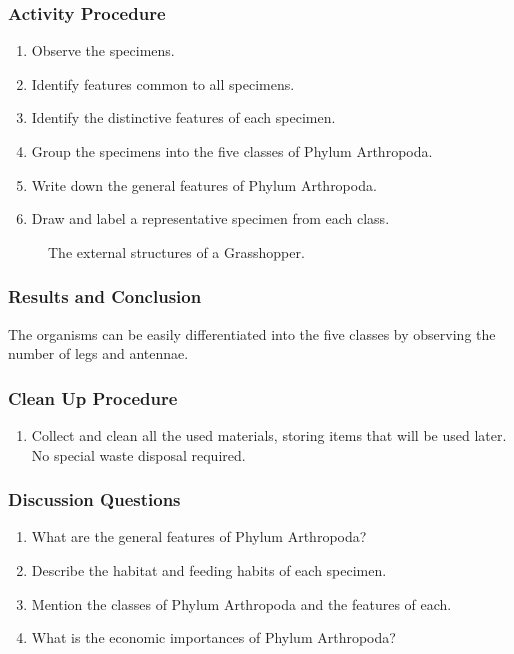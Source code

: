 \subsubsection*{Activity Procedure}
\begin{enumerate}
\item{Observe the specimens.}
\item{Identify features common to all specimens.}
\item{Identify the distinctive features of each specimen.}
\item{Group the specimens into the five classes of Phylum Arthropoda.}
\item{Write down the general features of Phylum Arthropoda.}
\item{Draw and label a representative specimen from each class.}
\end{enumerate}

\begin{figure}[h]
\begin{center}
\def\svgwidth{12cm}

\caption{The external structures of a Grasshopper.}
\label{fig:fish}
\end{center}
\end{figure}

\subsubsection*{Results and Conclusion}
The organisms can be easily differentiated into the five classes by observing the number of legs and antennae. 

\subsubsection*{Clean Up Procedure}
\begin{enumerate}
\item{Collect and clean all the used materials, storing items that will be used later. No special waste disposal required.}
\end{enumerate}

\subsubsection*{Discussion Questions}
\begin{enumerate}
\item{What are the general features of Phylum Arthropoda?}
\item{Describe the habitat and feeding habits of each specimen.}
\item{Mention the classes of Phylum Arthropoda and the features of each.}
\item{What is the economic importances of Phylum Arthropoda?}
\end{enumerate}



